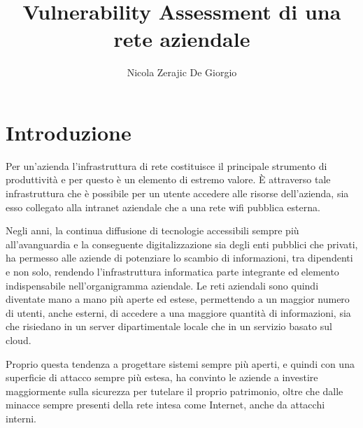 \documentclass[target=mst,aauheader=]{thud}
\title{Vulnerability Assessment di una rete aziendale}
\author{Nicola Zerajic De Giorgio}
\begin{document}
\maketitle

\tableofcontents


\listoffigures

\mainmatter


\chapter{Introduzione}

Per un’azienda l’infrastruttura di rete costituisce il principale strumento di produttività e per questo è un elemento di estremo valore. È attraverso tale infrastruttura che è possibile per un utente accedere alle risorse dell'azienda, sia esso collegato alla intranet aziendale che a una rete wifi pubblica esterna.

Negli anni, la continua diffusione di tecnologie accessibili sempre più all’avanguardia e la conseguente digitalizzazione sia degli enti pubblici che privati, ha permesso alle aziende di potenziare lo scambio di informazioni, tra dipendenti e non solo, rendendo l’infrastruttura informatica parte integrante ed elemento indispensabile nell’organigramma aziendale. Le reti aziendali sono quindi diventate mano a mano più aperte ed estese, permettendo a un maggior numero di utenti, anche esterni, di accedere a una maggiore quantità di informazioni, sia che risiedano in un server dipartimentale locale che in un servizio basato sul cloud.

Proprio questa tendenza a progettare sistemi sempre più aperti, e quindi con una superficie di attacco sempre più estesa, ha convinto le aziende a investire maggiormente sulla sicurezza per tutelare il proprio patrimonio, oltre che dalle minacce sempre presenti della rete intesa come Internet, anche da attacchi interni.
\end{document}
